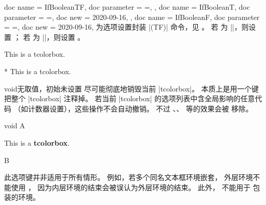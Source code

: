 \clearpage

\begin{docTcbKeys}[doc description = {无默认值}]
  {
    {
      doc name        = IfBooleanTF,
      doc parameter   = {=},
    },
    {
      doc name        = IfBooleanT,
      doc parameter   = {=},
      doc new         = 2020-09-16,
    },
    {
      doc name        = IfBooleanF,
      doc parameter   = {=},
      doc new         = 2020-09-16,
    }
  }
  为选项设置封装 |\IfBoolean(TF)| 命令，见 \cite{latexproject:usrguide}。
  若  为 |\BooleanTrue|，则设置 ；
  若  为 |\BooleanFalse|，则设置 。

\begin{dispExample}

\begin{mybox}
This is a tcolorbox.
\end{mybox}

\begin{mybox}*
This is a tcolorbox.
\end{mybox}
\end{dispExample}
\end{docTcbKeys}




\clearpage
\begin{docTcbKey}[][doc new=2016-10-21]{void}{}{无取值，初始未设置}
  尽可能彻底地销毁当前 |tcolorbox|。
  本质上是用一个键把整个 |tcolorbox| 注释掉。
  若当前 |tcolorbox| 的选项列表中含全局影响的任意代码
  （如计数器设置），这些操作不会自动撤销。
  不过 、、
   等的效果会被  移除。

\begin{exdispExample}{void}
A%
  \begin{tcolorbox}[
      title=This box is completely removed by the following key,
      void
    ]
  This is a \textbf{tcolorbox}.
  \end{tcolorbox}
B
\end{exdispExample}

\begin{marker}
  此选项键并非适用于所有情形。
  例如，若多个同名文本框环境嵌套，
  外层环境不能使用 ，
  因为内层环境的结束会被误认为外层环境的结束。
  此外， 不能用于
   包装的环境。
\end{marker}
\end{docTcbKey}


